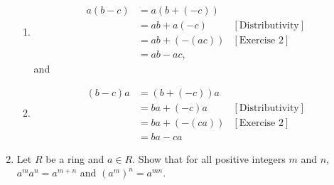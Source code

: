 \documentclass[9pt]{article}
\begin{document}
\begin{enumerate}
      \begin{enumerate}
         \item 
               \begin{align*}
                  a(b - c) &= a(b + (-c)) \\
                     &= ab + a(-c) &[\text{Distributivity}] \\
                     &= ab + (-(ac)) &[\text{Exercise 2}] \\
                     &= ab - ac,
               \end{align*}
               and
         \item 
               \begin{align*}
                  (b - c)a &= (b + (-c))a \\
                     &= ba + (-c)a &[\text{Distributivity}] \\
                     &= ba + (-(ca)) &[\text{Exercise 2}] \\
                     &= ba - ca
               \end{align*}
      \end{enumerate}
   \item Let $R$ be a ring and $a \in R$. Show that for all positive integers
         $m$ and $n$, $a^ma^n = a^{m + n}$ and $(a^m)^n = a^{mn}$.
         

\end{enumerate}
\end{document}
